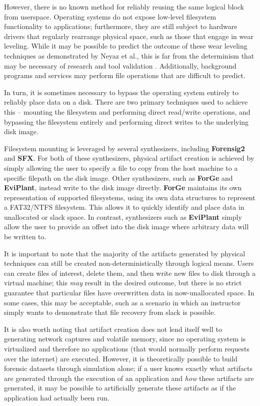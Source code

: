 \documentclass[letterpaper,12pt]{report}
\begin{document}
However, there is no known method for reliably reusing the same logical
block from userspace. Operating systems do not expose low-level
filesystem functionality to applications; furthermore, they are still
subject to hardware drivers that regularly rearrange physical space,
such as those that engage in wear leveling. While it may be possible to
predict the outcome of these wear leveling techniques as demonstrated by
Neyaz et al., this is far from the determinism that may be necessary of
research and tool validation \cite{neyazForensicAnalysisWear2018}.
Additionally, background programs and services may perform file
operations that are difficult to predict.

In turn, it is sometimes necessary to bypass the operating system
entirely to reliably place data on a disk. There are two primary
techniques used to achieve this -- mounting the filesystem and
performing direct read/write operations, and bypassing the filesystem
entirely and performing direct writes to the underlying disk image.

Filesystem mounting is leveraged by several synthesizers, including
\textbf{Forensig2} and \textbf{SFX}. For both of these synthesizers,
physical artifact creation is achieved by simply allowing the user to
specify a file to copy from the host machine to a specific filepath on
the disk image. Other synthesizers, such as \textbf{ForGe} and
\textbf{EviPlant}, instead write to the disk image directly.
\textbf{ForGe} maintains its own representation of supported
filesystems, using its own data structures to represent a FAT32/NTFS
filesystem. This allows it to quickly identify and place data in
unallocated or slack space. In contrast, synthesizers such as
\textbf{EviPlant} simply allow the user to provide an offset into the
disk image where arbitrary data will be written to.

It is important to note that the majority of the artifacts generated by
physical techniques can still be created non-deterministically through
logical means. Users can create files of interest, delete them, and then
write new files to disk through a virtual machine; this \emph{may}
result in the desired outcome, but there is no strict guarantee that
particular files have overwritten data in now-unallocated space. In some
cases, this may be acceptable, such as a scenario in which an instructor
simply wants to demonstrate that file recovery from slack is possible.

It is also worth noting that artifact creation does not lend itself well
to generating network captures and volatile memory, since no operating
system is virtualized and therefore no applications (that would normally
perform requests over the internet) are executed. However, it is
theoretically possible to build forensic datasets through simulation
alone; if a user knows exactly what artifacts are generated through the
execution of an application and \emph{how} these artifacts are
generated, it may be possible to artificially generate these artifacts
as if the application had actually been run.
\end{document}
